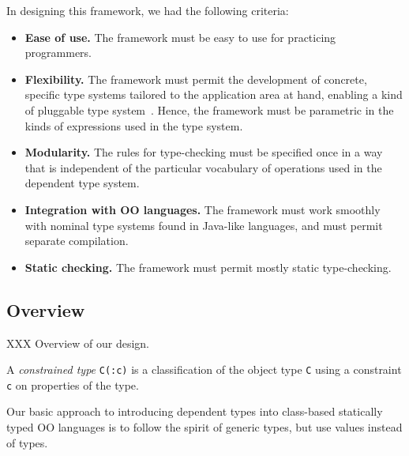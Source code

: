 %
%
%
%
%

In designing this framework, we had the following criteria:
\begin{itemize}
\item 
{\bf Ease of use.}
The framework must be 
easy to use for practicing programmers.

\item
{\bf Flexibility.}
The framework
must permit the development of concrete,
specific type systems tailored to the application area at
hand, enabling a kind of pluggable type system~\cite{bracha04-pluggable}.
Hence, the framework must be parametric in the kinds of
expressions used in the type system.

\item
{\bf Modularity.}
The rules for type-checking
must be specified once in a way that is independent of the
particular vocabulary of operations used in the dependent type
system.

\item
{\bf Integration with OO languages.}
The framework must
work smoothly with nominal type systems found in Java-like
languages, and must permit separate compilation.

\item
{\bf Static checking.}
The framework must permit mostly static type-checking. 
\end{itemize}

\subsection{Overview}

XXX Overview of our design.

A {\em constrained type} {\tt C(:c)} is a classification of the object
type {\tt C} using a constraint {\tt c} on properties of the type.

Our basic approach to introducing dependent types into
class-based statically typed OO languages is to
follow the spirit of generic types, but use values instead of
types.

